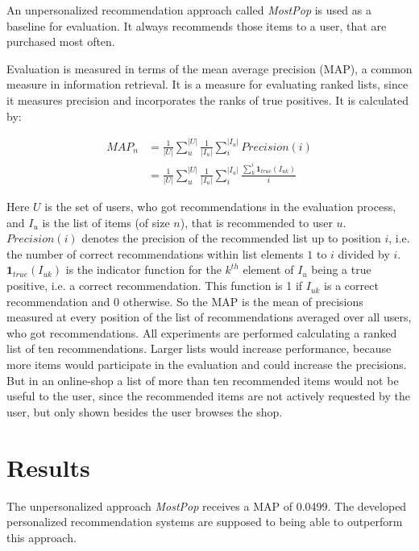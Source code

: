 \documentclass[10pt]{reportMaster}
\begin{document}
An unpersonalized recommendation approach called \textit{MostPop} is used as a baseline for evaluation.
It always recommends those items to a user, that are purchased most often.

Evaluation is measured in terms of the mean average precision (MAP), a common measure in information retrieval.
It is a measure for evaluating ranked lists, since it measures precision and incorporates the ranks of true positives.
It is calculated by:

\begin{align*}
	MAP_n &= \frac{1}{|U|} \sum_u^{|U|} \frac{1}{|I_u|}\sum_i^{|I_u|} Precision(i) \\
	&= \frac{1}{|U|} \sum_u^{|U|} \frac{1}{|I_u|}\sum_i^{|I_u|} \frac{\sum_{k}^{i}{\mathbf{1}_{true}(I_{uk})}}{i}
\end{align*}

Here $U$ is the set of users, who got recommendations in the evaluation process, and $I_u$ is the list of items (of size $n$), that is recommended to user $u$.
$Precision(i)$ denotes the precision of the recommended list up to position $i$, i.e. the number of correct recommendations within list elements $1$ to $i$ divided by $i$.
$\mathbf{1}_{true}(I_{uk})$ is the indicator function for the $k^{th}$ element of $I_{u}$ being a true positive, i.e. a correct recommendation.
This function is 1 if $I_{uk}$ is a correct recommendation and 0 otherwise.
So the MAP is the mean of precisions measured at every position of the list of recommendations averaged over all users, who got recommendations.
All experiments are performed calculating a ranked list of ten recommendations.
Larger lists would increase performance, because more items would participate in the evaluation and could increase the precisions.
But in an online-shop a list of more than ten recommended items would not be useful to the user, since the recommended items are not actively requested by the user, but only shown besides the user browses the shop. 


\section{Results}
\label{sec:results}
The unpersonalized approach \textit{MostPop} receives a MAP of 0.0499.
The developed personalized recommendation systems are supposed to being able to outperform this approach.
\end{document}
